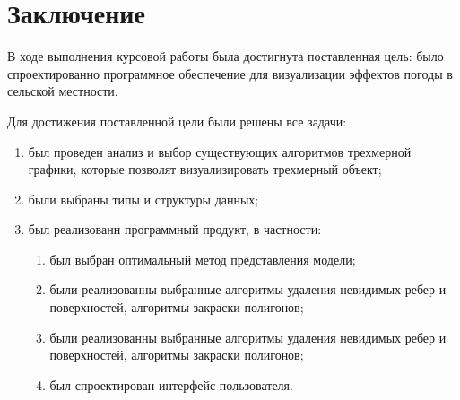 \chapter*{Заключение}

 В ходе выполнения курсовой работы была достигнута поставленная
цель: было спроектированно программное обеспечение для визуализации эффектов погоды в сельской местности.

Для достижения поставленной цели были решены все задачи:
\begin{enumerate}[label=---]
    \item был проведен анализ и выбор существующих алгоритмов трехмерной
графики, которые позволят визуализировать трехмерный объект;
    \item были выбраны типы и структуры данных;
    \item был реализованн программный продукт, в частности:
    \begin{enumerate}[label=---]
        \item был выбран оптимальный метод представления модели;
        \item были реализованны выбранные алгоритмы удаления невидимых ребер и поверхностей, алгоритмы закраски полигонов;
        \item были реализованны выбранные алгоритмы удаления невидимых ребер и поверхностей, алгоритмы закраски полигонов;
        \item был спроектирован интерфейс пользователя.
    \end{enumerate}
\end{enumerate}